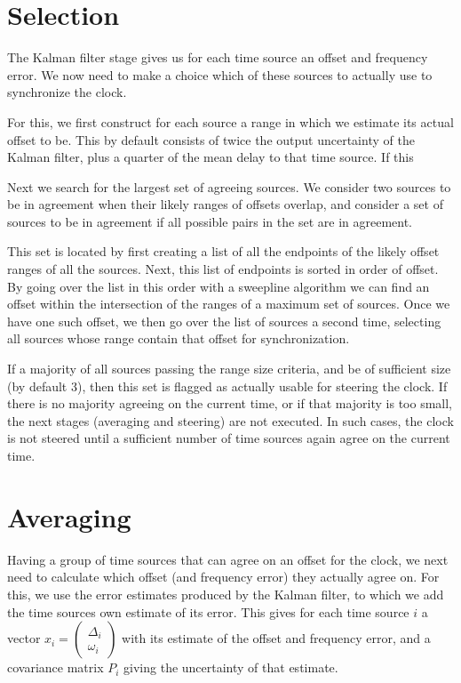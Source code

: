 \documentclass{article}
\begin{document}
\section{Selection}\label{sec:selection}

The Kalman filter stage gives us for each time source an offset and frequency error.
We now need to make a choice which of these sources to actually use to synchronize the clock.

For this, we first construct for each source a range in which we estimate its actual offset to be.
This by default consists of twice the output uncertainty of the Kalman filter, plus a quarter of the mean delay to that time source.
If this 

Next we search for the largest set of agreeing sources. We consider two sources to be in agreement when their likely ranges of offsets overlap,
and consider a set of sources to be in agreement if all possible pairs in the set are in agreement.

This set is located by first creating a list of all the endpoints of the likely offset ranges of all the sources.
Next, this list of endpoints is sorted in order of offset.
By going over the list in this order with a sweepline algorithm we can find an offset within the intersection of the ranges of a maximum set of sources.
Once we have one such offset, we then go over the list of sources a second time, selecting all sources whose range contain that offset for synchronization.

If a majority of all sources passing the range size criteria, and be of sufficient size (by default 3), then this set is flagged as actually usable for
steering the clock.
If there is no majority agreeing on the current time, or if that majority is too small, the next stages (averaging and steering) are not executed.
In such cases, the clock is not steered until a sufficient number of time sources again agree on the current time.

\section{Averaging}\label{sec:averaging}

Having a group of time sources that can agree on an offset for the clock, we next need to calculate which offset (and frequency error) they actually agree on.
For this, we use the error estimates produced by the Kalman filter, to which we add the time sources own estimate of its error.
This gives for each time source $i$ a vector $x_i = \begin{pmatrix}\Delta_i\\\omega_i\end{pmatrix}$ with its estimate of the offset and frequency error,
and a covariance matrix $P_i$ giving the uncertainty of that estimate.
\end{document}

